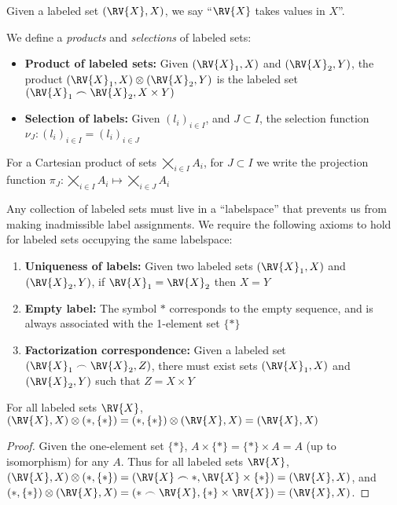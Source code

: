 Given a labeled set $(\RV{X},X)$, we say ``$\RV{X}$ takes values in $X$''.

We define a \emph{products} and \emph{selections} of labeled sets:

\begin{itemize}
    \item \textbf{Product of labeled sets:} Given $(\RV{X}_1,X)$ and $(\RV{X}_2,Y)$, the product $(\RV{X}_1,X)\otimes (\RV{X}_2,Y)$ is the labeled set $(\RV{X}_1\frown \RV{X}_2,X\times Y)$
    \item \textbf{Selection of labels:} Given $(l_i)_{i\in I}$, and $J\subset I$, the selection function $\nu_J:(l_i)_{i\in I}=(l_i)_{i\in J}$
\end{itemize}

For a Cartesian product of sets $\bigtimes_{i\in I} A_i$, for $J\subset I$ we write the projection function $\pi_{J}:\bigtimes_{i\in I} A_i\mapsto \bigtimes_{i\in J} A_i$

Any collection of labeled sets must live in a ``labelspace'' that prevents us from making inadmissible label assignments. We require the following axioms to hold for labeled sets occupying the same labelspace:

\begin{enumerate}
    \item \textbf{Uniqueness of labels:} Given two labeled sets $(\RV{X}_1,X)$ and $(\RV{X}_2,Y)$, if $\RV{X}_1=\RV{X}_2$ then $X=Y$
    \item \textbf{Empty label:} The symbol $*$ corresponds to the empty sequence, and is always associated with the 1-element set $\{*\}$
    \item \textbf{Factorization correspondence:} Given a labeled set $(\RV{X}_1\frown \RV{X}_2,Z)$, there must exist sets $(\RV{X}_1,X)$ and $(\RV{X}_2,Y)$ such that $Z=X\times Y$
\end{enumerate}

\begin{lemma}\label{lem:se_id}
For all labeled sets $\RV{X}$, $(\RV{X},X)\otimes (*,\{*\}) = (*,\{*\})\otimes (\RV{X},X) = (\RV{X},X)$
\end{lemma}

\begin{proof}
Given the one-element set $\{*\}$, $A\times\{*\}=\{*\}\times A=A$ (up to isomorphism) for any $A$. Thus for all labeled sets $\RV{X}$, $(\RV{X},X)\otimes (*,\{*\}) = (\RV{X}\frown *,\RV{X}\times\{*\}) = (\RV{X},X)$, and $(*,\{*\})\otimes(\RV{X},X) = (*\frown \RV{X},\{*\}\times\RV{X}) = (\RV{X},X)$.
\end{proof}

